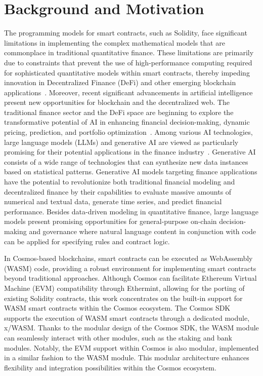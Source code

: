 \section{Background and Motivation}
The programming models for smart contracts, such as Solidity, face significant limitations in implementing the complex mathematical models that are commonplace in traditional quantitative finance. These limitations are primarily due to constraints that prevent the use of high-performance computing required for sophisticated quantitative models within smart contracts, thereby impeding innovation in Decentralized Finance (DeFi) and other emerging blockchain applications~\cite{shah2023systematic}. Moreover, recent significant advancements in artificial intelligence present new opportunities for blockchain and the decentralized web. The traditional finance sector and the DeFi space are beginning to explore the transformative potential of AI in enhancing financial decision-making, dynamic pricing, prediction, and portfolio optimization~\cite{cao:2020}. Among various AI technologies, large language models (LLMs) and generative AI are viewed as particularly promising for their potential applications in the finance industry~\cite{krause:2023}.
Generative AI consists of a wide range of technologies that can synthesize new data instances based on statistical patterns. Generative AI models targeting finance applications have the potential to revolutionize both traditional financial modeling and decentralized finance by their capabilities to evaluate massive amounts of numerical and textual data, generate time series, and predict financial performance. Besides data-driven modeling in quantitative finance, large language models present promising opportunities for general-purpose on-chain decision-making and governance where natural language content in conjunction with code can be applied for specifying rules and contract logic.

In Cosmos-based blockchains, smart contracts can be executed as WebAssembly (WASM) code, providing a robust environment for implementing smart contracts beyond traditional approaches. Although Cosmos can facilitate Ethereum Virtual Machine (EVM) compatibility through Ethermint, allowing for the porting of existing Solidity contracts, this work concentrates on the built-in support for WASM smart contracts within the Cosmos ecosystem. The Cosmos SDK supports the execution of WASM smart contracts through a dedicated module, x/WASM. Thanks to the modular design of the Cosmos SDK, the WASM module can seamlessly interact with other modules, such as the staking and bank modules. Notably, the EVM support within Cosmos is also modular, implemented in a similar fashion to the WASM module. This modular architecture enhances flexibility and integration possibilities within the Cosmos ecosystem.

